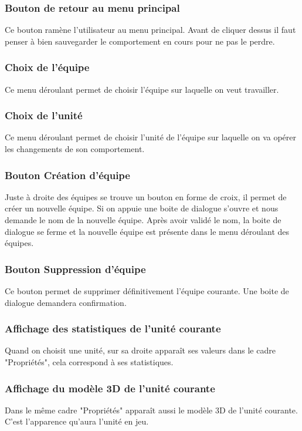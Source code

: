 \documentclass{report}
\begin{document}
\subsubsection{Bouton de retour au menu principal}
Ce bouton ramène l'utilisateur au menu principal. Avant de cliquer dessus il faut penser à bien sauvegarder le comportement en cours pour ne pas le perdre.

\subsubsection{Choix de l'équipe}
Ce menu déroulant permet de choisir l'équipe sur laquelle on veut travailler.
\subsubsection{Choix de l'unité}
Ce menu déroulant permet de choisir l'unité de l'équipe sur laquelle on va opérer les changements de son comportement.
\subsubsection{Bouton Création d'équipe}
Juste à droite des équipes se trouve un bouton en forme de croix, il permet de créer un nouvelle équipe. Si on appuie une boite de dialogue s'ouvre et nous demande le nom de la nouvelle équipe. Après avoir validé le nom, la boite de dialogue se ferme et la nouvelle équipe est présente dans le menu déroulant des équipes.
\subsubsection{Bouton Suppression d'équipe}
Ce bouton permet de supprimer définitivement l'équipe courante. Une boite de dialogue demandera confirmation.
\subsubsection{Affichage des statistiques de l'unité courante}
Quand on choisit une unité, sur sa droite apparaît ses valeurs dans le cadre "Propriétés", cela correspond à ses statistiques.
\subsubsection{Affichage du modèle 3D de l'unité courante}
Dans le même cadre "Propriétés" apparaît aussi le modèle 3D de l'unité courante. C'est l'apparence qu'aura l'unité en jeu.

\end{document}
